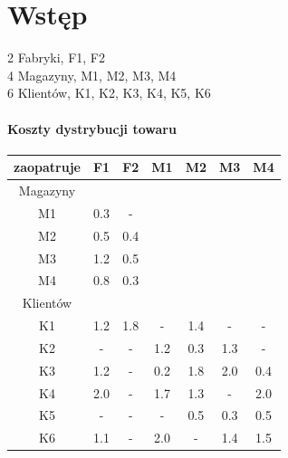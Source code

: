 \section{Wstęp} 
2 Fabryki, F1, F2 \\ 
4 Magazyny, M1, M2, M3, M4 \\ 
6 Klientów, K1, K2, K3, K4, K5, K6 \\ 
\paragraph{Koszty dystrybucji towaru}

\begin{center}
    \begin{tabular}{ | c | c | c | c | c | c | c |  }
        \hline
     zaopatruje & F1 & F2 & M1 & M2 & M3 & M4  \\ 
     \hline
     Magazyny &  &  &  &  &  &   \\ 
     \hline
     M1 & 0.3 & - &  &  &  &   \\ 
     \hline
     M2 & 0.5 & 0.4 &  &  &  &   \\ 
     \hline
     M3 & 1.2 & 0.5 &  &  &  &   \\ 
     \hline
     M4 & 0.8 & 0.3 &  &  &  &   \\ 
     \hline
     Klientów &  &  & &  &  & \\ 
     \hline
     K1 & 1.2 & 1.8 & - & 1.4 & - & -    \\ 
     \hline
     K2 & - & - & 1.2 & 0.3 & 1.3 & -  \\ 
     \hline
     K3 & 1.2 & - & 0.2 & 1.8 & 2.0 & 0.4  \\ 
     \hline
     K4 & 2.0 & - & 1.7 & 1.3 & - & 2.0  \\ 
     \hline
     K5 & - & - & - & 0.5 & 0.3 & 0.5  \\ 
     \hline
     K6 & 1.1 & - & 2.0 & - & 1.4 & 1.5  \\ 
     \hline
    \end{tabular}
    \end{center}

